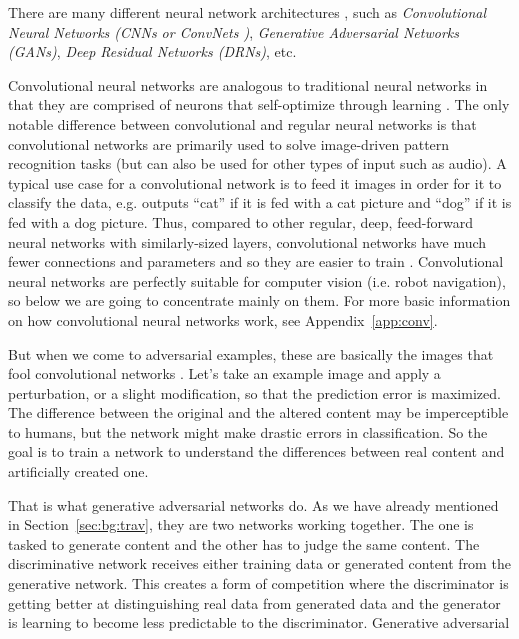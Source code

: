 \documentclass[12pt,a4paper,table,dvipsnames,tikz]{report}
\newcommand{\alleg}{\enquote}
\newcommand{\term}{\textit}
\newcommand{\acronym}{\MakeUppercase}
\begin{document}
	There are many different neural network architectures \citep{Veen}, such as 
	\term{Convolutional Neural Networks (\acronym{cnn}s or ConvNets \citep{Simonyan_vgg})}, 
	\term{Generative Adversarial Networks (\acronym{gan}s)}, \term{Deep Residual Networks 
	(\acronym{drn}s)}, etc.
	\par
	Convolutional neural networks are analogous to traditional neural networks in 
	that they are comprised of neurons that self-optimize through learning \citep{Shea}. 
	The only notable difference between convolutional and regular neural networks is 
	that convolutional networks are primarily used to solve image-driven pattern 
	recognition tasks (but can also be used for other types of input such as audio). 
	A typical use case for a convolutional network is to feed it images in order for 
	it to classify the data, e.g. outputs \alleg{cat} if it is fed with a cat picture 
	and \alleg{dog} if it is fed with a dog picture. Thus, compared to other regular, 
	deep, feed-forward neural networks with similarly-sized layers, convolutional 
	networks have much fewer connections and parameters and so they are easier to train 
	\citep{Krizhevsky_alexnet}. Convolutional neural networks are perfectly suitable for 
	computer vision (i.e. robot navigation), so below we are going to concentrate 
	mainly on them. For more basic information on how convolutional neural networks work, 
	see Appendix~\ref{app:conv}.
	\par
	But when we come to adversarial examples, these are basically the images that fool 
	convolutional networks \citep{Deshpande}. Let’s take an example image and apply 
	a perturbation, or a slight modification, so that the prediction error is maximized. 
	The difference between the original and the altered content may be imperceptible 
	to humans, but the network might make drastic errors in classification. So the 
	goal is to train a network to understand the differences between real content and 
	artificially created one. 
	\par
	That is what generative adversarial networks 
	\citep{Goodfellow} do. As we have already mentioned in Section~\ref{sec:bg:trav}, 
	they are two networks working together. The one is tasked 
	to generate content and the other has to judge the same content. The discriminative 
	network receives either training data or generated content from the generative 
	network. This creates a form of competition where the discriminator is getting 
	better at distinguishing real data from generated data and the generator is 
	learning to become less predictable to the discriminator. Generative adversarial 
\end{document}
